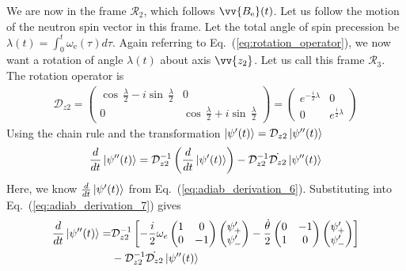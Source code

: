 %
We are now in the frame $\mathcal{R}_2$, which follows $\vv{B_\text{e}}(t)$. Let us follow the motion of the neutron spin vector in this frame. Let the total angle of spin precession be $\lambda(t)=\int_0^t\omega_\text{e}(\tau)d\tau$. Again referring to Eq.~(\ref{eq:rotation_operator}), we now want a rotation of angle $\lambda(t)$ about axis $\vv{z_2}$. Let us call this frame $\mathcal{R}_3$. The rotation operator is
%
\begin{gather}
    \mathcal{{D}}_{z2}=\left(\begin{matrix}
    \cos\,\frac{\lambda}{2}-i\sin\,\frac{\lambda}{2} & 0\\
    0 & \cos\,\frac{\lambda}{2}+i\sin\,\frac{\lambda}{2}
    \end{matrix}\right)
    =\left(\begin{matrix}
    e^{-\frac{i}{2}\lambda} & 0\\
    0 & e^{\frac{i}{2}\lambda}
    \end{matrix}\right)
\end{gather}
%
Using the chain rule and the transformation $\Ket{\psi'(t)}=\mathcal{{D}}_{z2}\Ket{\psi''(t)}$
%
\begin{gather}
    \frac{d}{dt}\Ket{\psi''(t)}=\mathcal{{D}}_{z2}^{-1}\left(\frac{d}{dt}\Ket{\psi'(t)}\right)-\mathcal{{D}}_{z2}^{-1}\dot{\mathcal{{D}}_{z2}}\Ket{\psi''(t)}
    \label{eq:adiab_derivation_7}
\end{gather}
%
Here, we know $\frac{d}{dt}\Ket{\psi'(t)}$ from Eq.~(\ref{eq:adiab_derivation_6}). Substituting into Eq.~(\ref{eq:adiab_derivation_7}) gives
%
\begin{align}
    \frac{d}{dt}\Ket{\psi''(t)}= & \mathcal{{D}}_{z2}^{-1}\left[-\frac{i}{2}\omega_{e}\left(\begin{matrix}
    1 & 0\\
    0 & -1
    \end{matrix}\right)\left(\begin{matrix}
    \psi'_{+}\\
    \psi'_{-}
    \end{matrix}\right)-\frac{\dot{\theta}}{2}\left(\begin{matrix}
    0 & -1\\
    1 & 0
    \end{matrix}\right)\left(\begin{matrix}
    \psi'_{+}\\
    \psi'_{-}
    \end{matrix}\right)\right] \nonumber \\
     & -\mathcal{{D}}_{z2}^{-1}\dot{\mathcal{{D}}_{z2}}\Ket{\psi''(t)}
     \label{eq:adiab_derivation_8}
\end{align}
